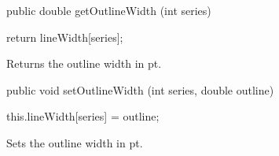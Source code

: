 \begin{code}

   public double getOutlineWidth (int series) \begin{hide} {
      return lineWidth[series];
   }\end{hide}
\end{code}
\begin{tabb}
    Returns the outline width in pt.
\end{tabb}
\begin{htmlonly}
\end{htmlonly}
\begin{code}

   public void setOutlineWidth (int series, double outline) \begin{hide} {
      this.lineWidth[series] = outline;
   }\end{hide}
\end{code}
\begin{tabb}
    Sets the outline width in pt.
\end{tabb}
\begin{htmlonly}
\end{htmlonly}

